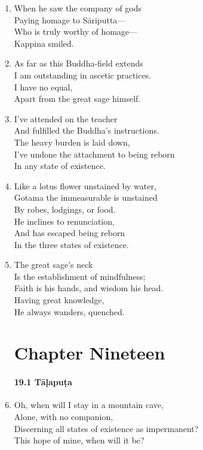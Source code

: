 \documentclass[10pt, openany]{book}
\begin{document}
\begin{enumerate}
\item When he saw the company of gods\\
Paying homage to Sāriputta—\\
Who is truly worthy of homage—\\
Kappina smiled.

\item As far as this Buddha-field extends\\
I am outstanding in ascetic practices.\\
I have no equal,\\
Apart from the great sage himself.

\item I’ve attended on the teacher\\
And fulfilled the Buddha’s instructions.\\
The heavy burden is laid down,\\
I’ve undone the attachment to being reborn \\
In any state of existence.

\item Like a lotus flower unstained by water,\\
Gotama the immeasurable is unstained\\
By robes, lodgings, or food.\\
He inclines to renunciation,\\
And has escaped being reborn\\
In the three states of existence.

\item The great sage’s neck \\
Is the establishment of mindfulness;\\
Faith is his hands, and wisdom his head.\\
Having great knowledge,\\
He always wanders, quenched.

\chapter*{Chapter Nineteen}

\subsubsection*{19.1 Tāḷapuṭa}

\item Oh, when will I stay in a mountain cave,\\
Alone, with no companion,\\
Discerning all states of existence as impermanent?\\
This hope of mine, when will it be?


\end{enumerate}
\end{document}
